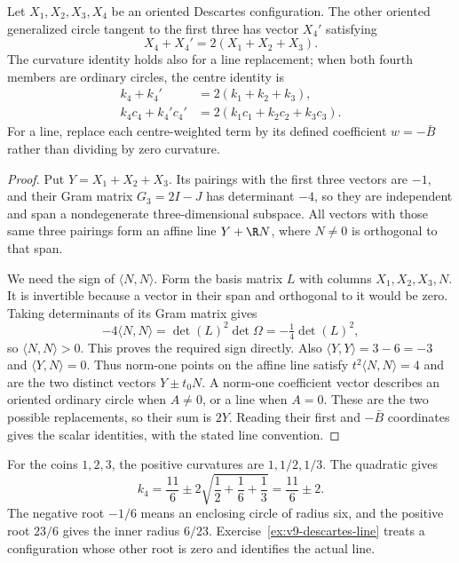 \begin{proposition}\label{geometry:prop:swap}
Let $X_1,X_2,X_3,X_4$ be an oriented Descartes configuration. The other oriented generalized circle tangent to the first three has vector $X_4'$ satisfying
\[
X_4+X_4'=2(X_1+X_2+X_3).
\]
The curvature identity holds also for a line replacement; when both fourth members are ordinary circles, the centre identity is
\begin{equation}\label{geometry:eq:descartesswap}
\begin{aligned}
k_4+k_4'&=2(k_1+k_2+k_3),\\
k_4c_4+k_4'c_4'&=2(k_1c_1+k_2c_2+k_3c_3).
\end{aligned}
\end{equation}
For a line, replace each centre-weighted term by its defined coefficient $w=-\bar B$ rather than dividing by zero curvature.
\end{proposition}
\begin{proof}
Put $Y=X_1+X_2+X_3$. Its pairings with the first three vectors are $-1$, and their Gram matrix $G_3=2I-J$ has determinant $-4$, so they are independent and span a nondegenerate three-dimensional subspace. All vectors with those same three pairings form an affine line $Y+\R N$, where $N\ne0$ is orthogonal to that span.

We need the sign of $\langle N,N\rangle$. Form the basis matrix $L$ with columns $X_1,X_2,X_3,N$. It is invertible because a vector in their span and orthogonal to it would be zero. Taking determinants of its Gram matrix gives
\[
-4\langle N,N\rangle
=\det(L)^2\det\Omega=-\tfrac14\det(L)^2,
\]
so $\langle N,N\rangle>0$. This proves the required sign directly. Also $\langle Y,Y\rangle=3-6=-3$ and $\langle Y,N\rangle=0$. Thus norm-one points on the affine line satisfy
$t^2\langle N,N\rangle=4$ and are the two distinct vectors $Y\pm t_0N$. A norm-one coefficient vector describes an oriented ordinary circle when $A\ne0$, or a line when $A=0$. These are the two possible replacements, so their sum is $2Y$. Reading their first and $-\bar B$ coordinates gives the scalar identities, with the stated line convention.
\end{proof}

For the coins $1,2,3$, the positive curvatures are $1,1/2,1/3$. The quadratic gives
\[
k_4=\frac{11}{6}\pm2\sqrt{\frac12+\frac16+\frac13}
=\frac{11}{6}\pm2.
\]
The negative root $-1/6$ means an enclosing circle of radius six, and the positive root $23/6$ gives the inner radius $6/23$. Exercise~\ref{ex:v9-descartes-line} treats a configuration whose other root is zero and identifies the actual line.

